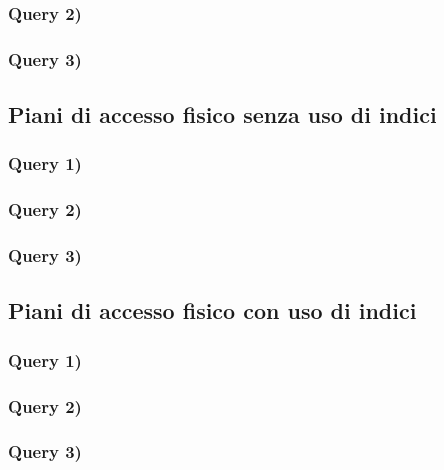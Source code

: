\documentclass[a4paper,12pt]{article}
\begin{document}
 \subsubsection{ Query 2) }

 \subsubsection{ Query 3) }

 \subsection{ Piani di accesso fisico senza uso di indici }

 \subsubsection{ Query 1) }

 \subsubsection{ Query 2) }

 \subsubsection{ Query 3) }

 \subsection{ Piani di accesso fisico con uso di indici }

 \subsubsection{ Query 1) }

 \subsubsection{ Query 2) }

 \subsubsection{ Query 3) }
\end{document}
